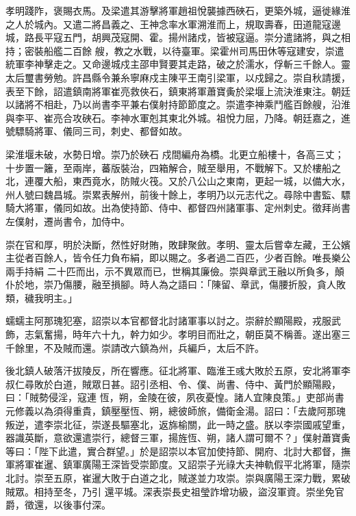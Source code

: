 \begin{pinyinscope}
 孝明踐阼，褒賜衣馬。及梁遣其游擊將軍趙祖悅襲據西硤石，更築外城，逼徙緣淮之人於城內。又遣二將昌義之、王神念率水軍溯淮而上，規取壽春，田道龍寇邊城，路長平寇五門，胡興茂寇開、霍。揚州諸戍，皆被寇逼。崇分遣諸將，與之相持；密裝船艦二百餘
 艘，教之水戰，以待臺軍。梁霍州司馬田休等寇建安，崇遣統軍李神擊走之。又命邊城戍主邵申賢要其走路，破之於濡水，俘斬三千餘人。靈太后璽書勞勉。許昌縣令兼糸寧麻戍主陳平王南引梁軍，以戍歸之。崇自秋請援，表至下餘，詔遣鎮南將軍崔亮救俠石，鎮東將軍蕭寶夤於梁堰上流決淮東注。朝廷以諸將不相赴，乃以尚書李平兼右僕射持節節度之。崇遣李神乘鬥艦百餘艘，沿淮與李平、崔亮合攻硤石。李神水軍剋其東北外城。祖悅力屈，乃降。朝廷嘉之，進號驃騎將軍、儀同三司，刺史、都督如故。



 梁淮堰未破，水勢日增。崇乃於硤石
 戍間編舟為橋。北更立船樓十，各高三丈；十步置一籬，至兩岸，蕃版裝治，四箱解合，賊至舉用，不戰解下。又於樓船之北，連覆大船，東西竟水，防賊火筏。又於八公山之東南，更起一城，以備大水，州人號曰魏昌城。崇累表解州，前後十餘上，孝明乃以元志代之。尋除中書監、驃騎大將軍，儀同如故。出為使持節、侍中、都督四州諸軍事、定州刺史。徵拜尚書左僕射，遷尚書令，加侍中。



 崇在官和厚，明於決斷，然性好財賄，敗肆聚斂。孝明、靈太后嘗幸左藏，王公嬪主從者百餘人，皆令任力負布絹，即以賜之。多者過二百匹，少者百餘。唯長樂公兩手持絹
 二十匹而出，示不異眾而已，世稱其廉儉。崇與章武王融以所負多，顛仆於地，崇乃傷腰，融至損腳。時人為之語曰：「陳留、章武，傷腰折股，貪人敗類，穢我明主。」



 蠕蠕主阿那瑰犯塞，詔崇以本官都督北討諸軍事以討之。崇辭於顯陽殿，戎服武飾，志氣奮揚，時年六十九，幹力如少。孝明目而壯之，朝臣莫不稱善。遂出塞三千餘里，不及賊而還。崇請改六鎮為州，兵編戶，太后不許。



 後北鎮人破落汗拔陵反，所在響應。征北將軍、臨淮王彧大敗於五原，安北將軍李叔仁尋敗於白道，賊眾日甚。詔引丞相、令、僕、尚書、侍中、黃門於顯陽殿，曰：「賊勢侵淫，寇連
 恆，朔，金陵在彼，夙夜憂惶。諸人宜陳良策。」吏部尚書元修義以為須得重貴，鎮壓壓恆、朔，總彼師旅，備衛金湯。詔曰：「去歲阿那瑰叛逆，遣李崇北征，崇遂長驅塞北，返旆榆關，此一時之盛。朕以李崇國戚望重，器識英斷，意欲還遣崇行，總督三軍，揚旌恆、朔，諸人謂可爾不？」僕射蕭寶夤等曰：「陛下此遣，實合群望。」於是詔崇以本官加使持節、開府、北討大都督，撫軍將軍崔暹、鎮軍廣陽王深皆受崇節度。又詔崇子光祿大夫神軌假平北將軍，隨崇北討。崇至五原，崔暹大敗于白道之北，賊遂並力攻崇。崇與廣陽王深力戰，累破賊眾。相持至冬，乃引
 還平城。深表崇長史祖瑩詐增功級，盜沒軍資。崇坐免官爵，徵還，以後事付深。




\end{pinyinscope}
